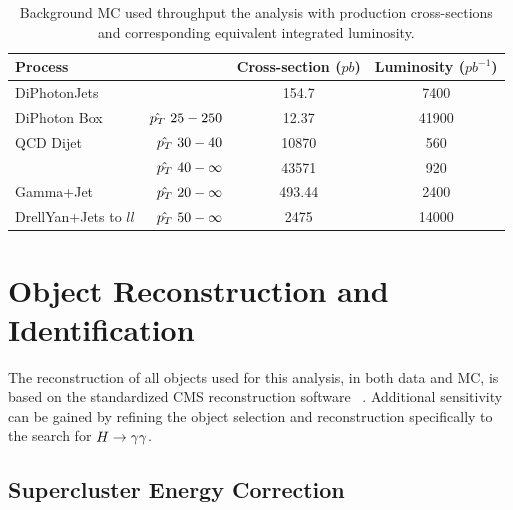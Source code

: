 \begin{table}
\begin{center}
\begin{tabular}{|l r|c|c|}
\hline
\textbf{Process}  & &  \textbf{Cross-section} ($pb$) & \textbf{Luminosity} ($pb^{-1}$)\\
\hline
\hline
DiPhotonJets & & 154.7 & 7400 \\
\hline
DiPhoton Box & $\hat{p_{T}}~25-250$ & 12.37 & 41900 \\
\hline 
QCD Dijet    & $\hat{p_{T}}~30-40$      & 10870 & 560 \\
	     & $\hat{p_{T}}~40-\infty$  & 43571 & 920 \\
\hline 
Gamma+Jet    & $\hat{p_{T}}~20-\infty$  & 493.44& 2400 \\
\hline 
DrellYan+Jets to $ll$  & $\hat{p_{T}}~50-\infty$  & 2475& 14000 \\
\hline
\end{tabular}
\caption{Background MC used throughput the analysis with production cross-sections and 
corresponding equivalent integrated luminosity.}
\label{tab:backgroundmc}
\end{center}
\end{table}


\section{Object Reconstruction and Identification}
\label{sec:objectrecoandid}

The reconstruction of all objects used for this analysis, in both data and MC,
is based on the standardized CMS reconstruction software \texttt{\cmssw}~\citep{null}. 
Additional sensitivity can be gained by refining the object selection and reconstruction specifically
to the search for $H\rightarrow\gamma\gamma$.

\subsection{Supercluster Energy Correction}
\label{sec:superclusterenergyreconstruction}

